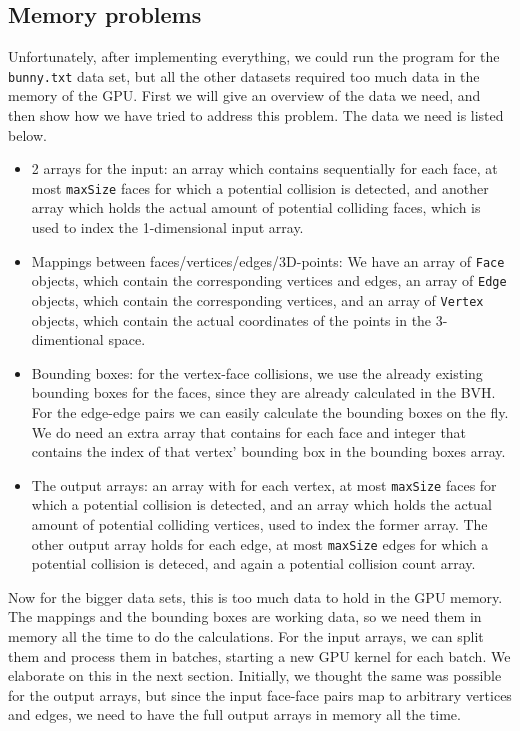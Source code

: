 \subsection{Memory problems}
Unfortunately, after implementing everything, we could run the program for the \texttt{bunny.txt} data set, but all the other datasets required too much data in the memory of the GPU. First we will give an overview of the data we need, and then show how we have tried to address this problem. The data we need is listed below.

\begin{itemize}
	\item 2 arrays for the input: an array which contains sequentially for each face, at most \texttt{maxSize} faces for which a potential collision is detected, and another array which holds the actual amount of potential colliding faces, which is used to index the 1-dimensional input array.
	\item Mappings between faces/vertices/edges/3D-points: We have an array of \texttt{Face} objects, which contain the corresponding vertices and edges, an array of \texttt{Edge} objects, which contain the corresponding vertices, and an array of \texttt{Vertex} objects, which contain the actual coordinates of the points in the 3-dimentional space.
	\item Bounding boxes: for the vertex-face collisions, we use the already existing bounding boxes for the faces, since they are already calculated in the BVH. For the edge-edge pairs we can easily calculate the bounding boxes on the fly. We do need an extra array that contains for each face and integer that contains the index of that vertex' bounding box in the bounding boxes array.
	\item The output arrays: an array with for each vertex, at most \texttt{maxSize} faces for which a potential collision is detected, and an array which holds the actual amount of potential colliding vertices, used to index the former array. The other output array holds for each edge, at most \texttt{maxSize} edges for which a potential collision is deteced, and again a potential collision count array.
\end{itemize}

Now for the bigger data sets, this is too much data to hold in the GPU memory. The mappings and the bounding boxes are working data, so we need them in memory all the time to do the calculations. For the input arrays, we can split them and process them in batches, starting a new GPU kernel for each batch. We elaborate on this in the next section. Initially, we thought the same was possible for the output arrays, but since the input face-face pairs map to arbitrary vertices and edges, we need to have the full output arrays in memory all the time.\\

